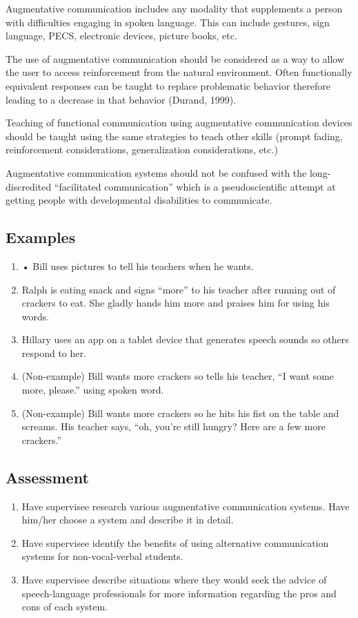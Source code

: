 Augmentative communication includes any modality that supplements a person with difficulties engaging in spoken language. This can include gestures, sign language, PECS, electronic devices, picture books, etc.

The use of augmentative communication should be considered as a way to allow the user to access reinforcement from the natural environment. Often functionally equivalent responses can be taught to replace problematic behavior therefore leading to a decrease in that behavior (Durand, 1999).

Teaching of functional communication using augmentative communication devices should be taught using the same strategies to teach other skills (prompt fading, reinforcement considerations, generalization considerations, etc.)

Augmentative communication systems should not be confused with the long-discredited ``facilitated communication'' which is a pseudoscientific attempt at getting people with developmental disabilities to communicate.

\subsection{Examples}
\begin{enumerate}
\item     • Bill uses pictures to tell his teachers when he wants.
\item Ralph is eating snack and signs ``more'' to his teacher after running out of crackers to eat. She gladly hands him more and praises him for using his words.
\item Hillary uses an app on a tablet device that generates speech sounds so others respond to her.
\item (Non-example) Bill wants more crackers so tells his teacher, ``I want some more, please.'' using spoken word.
\item (Non-example) Bill wants more crackers so he hits his fist on the table and screams. His teacher says, ``oh, you're still hungry? Here are a few more crackers.''
\end{enumerate}
%
\subsection{Assessment}
\begin{enumerate}
\item Have supervisee research various augmentative communication systems. Have him/her choose a system and describe it in detail.
\item Have supervisee identify the benefits of using alternative communication systems for non-vocal-verbal students.
\item Have supervisee describe situations where they would seek the advice of speech-language professionals for more information regarding the pros and cons of each system.
\end{enumerate}
%
